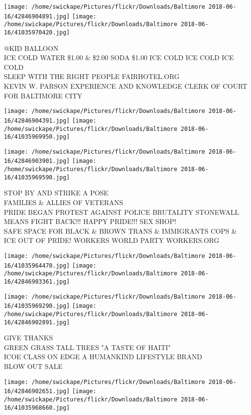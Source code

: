 \documentclass[10pt,letterpaper]{article}
\begin{document}
\texttt{[image: /home/swickape/Pictures/flickr/Downloads/Baltimore 2018-06-16/42846904891.jpg]}
\texttt{[image: /home/swickape/Pictures/flickr/Downloads/Baltimore 2018-06-16/41035970420.jpg]}

@KID BALLOON\\
ICE COLD WATER \$1.00 \& \$2.00 SODA \$1.00 ICE COLD ICE COLD ICE COLD\\
SLEEP WITH THE RIGHT PEOPLE FAIRHOTEL.ORG\\
KEVIN W. PARSON EXPERIENCE AND KNOWLEDGE CLERK OF COURT FOR BALTIMORE CITY\\
\pagebreak

\texttt{[image: /home/swickape/Pictures/flickr/Downloads/Baltimore 2018-06-16/42846904391.jpg]}
\texttt{[image: /home/swickape/Pictures/flickr/Downloads/Baltimore 2018-06-16/41035969950.jpg]}

\texttt{[image: /home/swickape/Pictures/flickr/Downloads/Baltimore 2018-06-16/42846903901.jpg]}
\texttt{[image: /home/swickape/Pictures/flickr/Downloads/Baltimore 2018-06-16/41035969590.jpg]}

STOP BY AND STRIKE A POSE\\
FAMILIES \& ALLIES OF VETERANS\\
PRIDE BEGAN PROTEST AGAINST POLICE BRUTALITY STONEWALL MEANS FIGHT BACK!!! HAPPY PRIDE!!! SEX SHOP!\\
SAFE SPACE FOR BLACK \& BROWN TRANS \& IMMIGRANTS COPS \& ICE OUT OF PRIDE!  WORKERS WORLD PARTY WORKERS.ORG\\
\pagebreak

\texttt{[image: /home/swickape/Pictures/flickr/Downloads/Baltimore 2018-06-16/41035964470.jpg]}
\texttt{[image: /home/swickape/Pictures/flickr/Downloads/Baltimore 2018-06-16/42846903361.jpg]}

\texttt{[image: /home/swickape/Pictures/flickr/Downloads/Baltimore 2018-06-16/41035969290.jpg]}
\texttt{[image: /home/swickape/Pictures/flickr/Downloads/Baltimore 2018-06-16/42846902891.jpg]}

GIVE THANKS\\
GREEN GRASS TALL TREES "A TASTE OF HAITI"\\
ICOE CLASS ON EDGE A HUMANKIND LIFESTYLE BRAND\\
BLOW OUT SALE\\
\pagebreak

\texttt{[image: /home/swickape/Pictures/flickr/Downloads/Baltimore 2018-06-16/42846902651.jpg]}
\texttt{[image: /home/swickape/Pictures/flickr/Downloads/Baltimore 2018-06-16/41035968660.jpg]}
\end{document}
